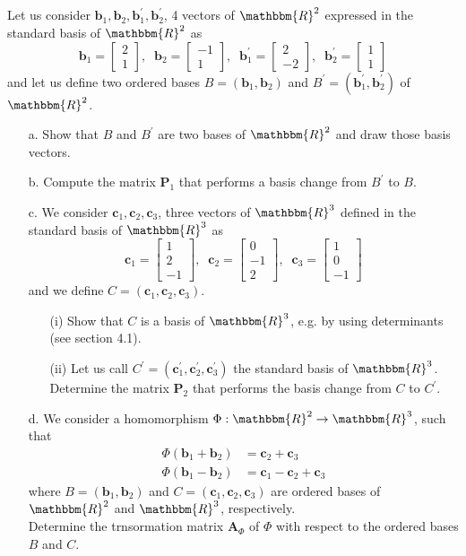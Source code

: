 \documentclass[a4paper,12pt]{article}
\newcommand{\R}{\mathbbm{R}}
\newcommand{\M}[1]{ \begin{bmatrix} #1 \end{bmatrix} }
\newcommand{\vecb}{\textbf{b}}
\newcommand{\vecc}{\textbf{c}}
\newcommand{\matA}{\textbf{A}}
\newcommand{\pr}{^\prime}
\begin{document}
\subsection{}
Let us consider $\vecb_1,\vecb_2, \vecb_1\pr, \vecb_2\pr$, 4 vectors of $\R^2$ expressed in the standard basis of $\R^2$ as
$$\vecb_1 = \M{2\\1}, \;\; \vecb_2 = \M{-1\\1}, \;\; \vecb_1\pr = \M{2\\-2}, \;\; \vecb_2\pr = \M{1\\1}$$
and let us define two ordered bases $B = (\vecb_1,\vecb_2)$ and $B\pr = (\vecb_1\pr,\vecb_2\pr)$ of $\R^2$.
\begin{itemize}
 \item [a.] Show that $B$ and $B\pr$ are two bases of $\R^2$ and draw those basis vectors.
 \item [b.] Compute the matrix $\textbf{P}_1$ that performs a basis change from $B\pr$ to $B$.
 \item [c.] We consider $\vecc_1, \vecc_2, \vecc_3$, three vectors of $\R^3$ defined in the standard basis of $\R^3$ as
 $$\vecc_1 = \M{1\\2\\-1}, \;\; \vecc_2 = \M{0\\-1\\2}, \;\; \vecc_3 = \M{1\\0\\-1}$$
 and we define $C = (\vecc_1, \vecc_2, \vecc_3)$.
 \begin{enumerate}
  \item [(i)] Show that $C$ is a basis of $\R^3$, e.g. by using determinants (see section 4.1).
  \item [(ii)] Let us call $C\pr = (\vecc_1\pr,\vecc_2\pr,\vecc_3\pr)$ the standard basis of $\R^3$. Determine the matrix $\textbf{P}_2$ that performs the basis change from $C$ to $C\pr$.
 \end{enumerate}
 \item [d.] We consider a homomorphism $\Phi: \R^2 \rightarrow \R^3$, such that
 \begin{align*}
  \Phi(\vecb_1 + \vecb_2) &= \vecc_2+\vecc_3 \\
  \Phi(\vecb_1 - \vecb_2) &= \vecc_1-\vecc_2+\vecc_3
 \end{align*}
 where $B = (\vecb_1,\vecb_2)$ and $C = (\vecc_1,\vecc_2,\vecc_3)$ are ordered bases of $\R^2$ and $\R^3$, respectively. \\
 Determine the trnsormation matrix $\matA_\Phi$ of $\Phi$ with respect to the ordered bases $B$ and $C$.

\end{itemize}
\end{document}
